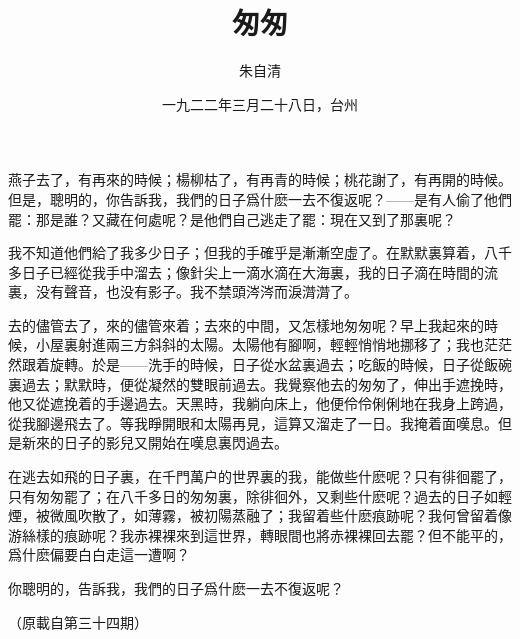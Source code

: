 \documentclass[a5j,12pt]{ltjtarticle}
\title{\gtfamily 匆匆}
\author{\small\kai 朱自清}
\date{}
\begin{document}
\maketitle

燕子去了，有再來的時候；楊柳枯了，有再青的時候；桃花謝了，有再開的時候。但是，聰明的，你告訴我，我們的日子爲什麽一去不復返呢？——是有人偷了他們罷：那是誰？又藏在何處呢？是他們自己逃走了罷：現在又到了那裏呢？

我不知道他們給了我多少日子；但我的手確乎是漸漸空虛了。在默默裏算着，八千多日子已經從我手中溜去；像針尖上一滴水滴在大海裏，我的日子滴在時間的流裏，没有聲音，也没有影子。我不禁頭涔涔而淚潸潸了。

去的儘管去了，來的儘管來着；去來的中間，又怎樣地匆匆呢？早上我起來的時候，小屋裏射進兩三方斜斜的太陽。太陽他有腳啊，輕輕悄悄地挪移了；我也茫茫然跟着旋轉。於是——洗手的時候，日子從水盆裏過去；吃飯的時候，日子從飯碗裏過去；默默時，便從凝然的雙眼前過去。我覺察他去的匆匆了，伸出手遮挽時，他又從遮挽着的手邊過去。天黑時，我躺向床上，他便伶伶俐俐地在我身上跨過，從我腳邊飛去了。等我睜開眼和太陽再見，這算又溜走了一日。我掩着面嘆息。但是新來的日子的影兒又開始在嘆息裏閃過去。

在逃去如飛的日子裏，在千門萬户的世界裏的我，能做些什麽呢？只有徘徊罷了，只有匆匆罷了；在八千多日的匆匆裏，除徘徊外，又剩些什麽呢？過去的日子如輕煙，被微風吹散了，如薄霧，被初陽蒸融了；我留着些什麽痕跡呢？我何曾留着像游絲樣的痕跡呢？我赤裸裸來到這世界，轉眼間也將赤裸裸回去罷？但不能平的，爲什麽偏要白白走這一遭啊？

你聰明的，告訴我，我們的日子爲什麽一去不復返呢？

\hfill \date{一九二二年三月二十八日，台州}\hspace{\parindent}

\hfill （原載自第三十四期）\hspace{2\parindent}
\end{document}
